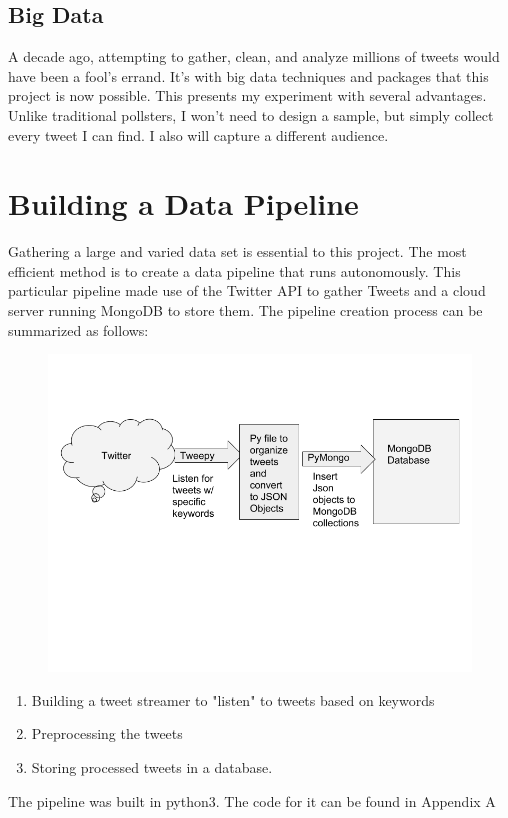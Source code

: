 \documentclass[11pt, twoside, reqno]{book}
\begin{document}
\section{Big Data}
\hspace{0.1in}A decade ago, attempting to gather, clean, and analyze millions of tweets would have been a fool's errand. It's with big data techniques and packages that this project is now possible. This presents my experiment with several advantages. Unlike traditional pollsters, I won't need to design a sample, but simply collect every tweet I can find. I also will capture a different audience. 


\chapter{Building a Data Pipeline}
\label{label}
\hspace{0.1in}Gathering a large and varied data set is essential to this project. The most efficient method is to create a data pipeline that runs autonomously. This particular pipeline  made use of the Twitter API to gather Tweets and a cloud server running MongoDB to store them. The pipeline creation process can be summarized as follows:
\begin{figure}[h]
	\includegraphics[scale=0.5]{data_collection}
\end{figure}
\begin{enumerate}
	\item Building a tweet streamer to "listen" to tweets based on keywords
	\item Preprocessing the tweets
	\item Storing processed tweets in a database. 
\end{enumerate}
The pipeline was built in python3. The code for it can be found in Appendix A
\end{document}
